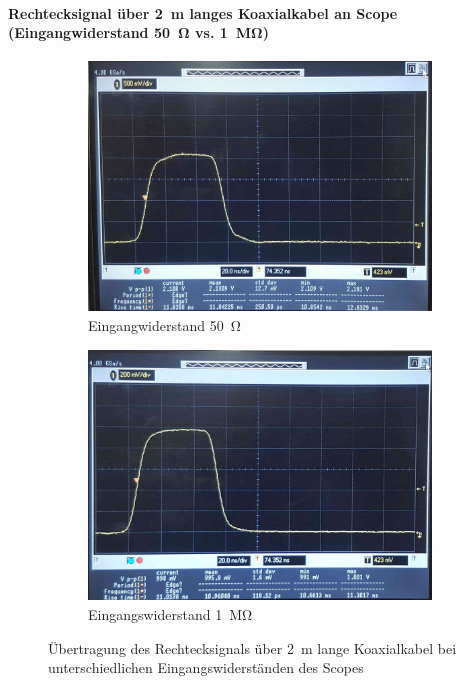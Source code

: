\documentclass[a4paper,twoside,final]{article}
\begin{document}
\paragraph{Rechtecksignal über \SI{2}{\meter} langes Koaxialkabel an Scope (Eingangwiderstand \SI{50}{\ohm} vs. \SI{1}{\mega\ohm})}

\begin{figure}[htp]
    \centering
    \begin{subfigure}{0.45\textwidth}
        \includegraphics[width=\textwidth]{Bilder/Bild1.jpg}
        \caption{Eingangwiderstand \SI{50}{\ohm}}
    \end{subfigure}\hspace{1cm}
    \begin{subfigure}{0.45\textwidth}
        \includegraphics[width=\textwidth]{Bilder/Bild2.jpg}
        \caption{Eingangswiderstand \SI{1}{\mega\ohm}}
    \end{subfigure}
    \caption{Übertragung des Rechtecksignals über \SI{2}{\meter} lange Koaxialkabel bei unterschiedlichen Eingangswiderständen des Scopes}
\end{figure}
\FloatBarrier
\end{document}
